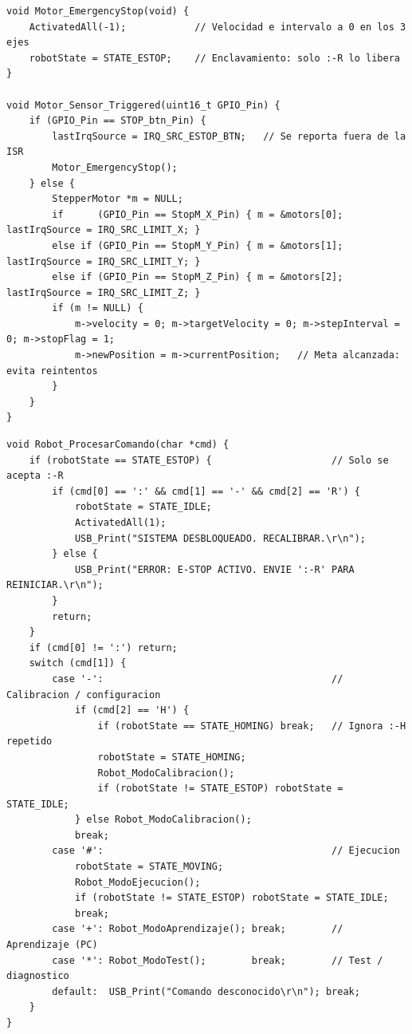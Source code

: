\begin{lstlisting}[caption={Atención de finales de carrera y parada de emergencia (\texttt{motor\_driver.c}).}]
void Motor_EmergencyStop(void) {
    ActivatedAll(-1);            // Velocidad e intervalo a 0 en los 3 ejes
    robotState = STATE_ESTOP;    // Enclavamiento: solo :-R lo libera
}

void Motor_Sensor_Triggered(uint16_t GPIO_Pin) {
    if (GPIO_Pin == STOP_btn_Pin) {
        lastIrqSource = IRQ_SRC_ESTOP_BTN;   // Se reporta fuera de la ISR
        Motor_EmergencyStop();
    } else {
        StepperMotor *m = NULL;
        if      (GPIO_Pin == StopM_X_Pin) { m = &motors[0]; lastIrqSource = IRQ_SRC_LIMIT_X; }
        else if (GPIO_Pin == StopM_Y_Pin) { m = &motors[1]; lastIrqSource = IRQ_SRC_LIMIT_Y; }
        else if (GPIO_Pin == StopM_Z_Pin) { m = &motors[2]; lastIrqSource = IRQ_SRC_LIMIT_Z; }
        if (m != NULL) {
            m->velocity = 0; m->targetVelocity = 0; m->stepInterval = 0; m->stopFlag = 1;
            m->newPosition = m->currentPosition;   // Meta alcanzada: evita reintentos
        }
    }
}
\end{lstlisting}

\begin{lstlisting}[caption={Intérprete de comandos con enclavamiento de E-STOP (\texttt{robot\_logic.c}).}]
void Robot_ProcesarComando(char *cmd) {
    if (robotState == STATE_ESTOP) {                     // Solo se acepta :-R
        if (cmd[0] == ':' && cmd[1] == '-' && cmd[2] == 'R') {
            robotState = STATE_IDLE;
            ActivatedAll(1);
            USB_Print("SISTEMA DESBLOQUEADO. RECALIBRAR.\r\n");
        } else {
            USB_Print("ERROR: E-STOP ACTIVO. ENVIE ':-R' PARA REINICIAR.\r\n");
        }
        return;
    }
    if (cmd[0] != ':') return;
    switch (cmd[1]) {
        case '-':                                        // Calibracion / configuracion
            if (cmd[2] == 'H') {
                if (robotState == STATE_HOMING) break;   // Ignora :-H repetido
                robotState = STATE_HOMING;
                Robot_ModoCalibracion();
                if (robotState != STATE_ESTOP) robotState = STATE_IDLE;
            } else Robot_ModoCalibracion();
            break;
        case '#':                                        // Ejecucion
            robotState = STATE_MOVING;
            Robot_ModoEjecucion();
            if (robotState != STATE_ESTOP) robotState = STATE_IDLE;
            break;
        case '+': Robot_ModoAprendizaje(); break;        // Aprendizaje (PC)
        case '*': Robot_ModoTest();        break;        // Test / diagnostico
        default:  USB_Print("Comando desconocido\r\n"); break;
    }
}
\end{lstlisting}

